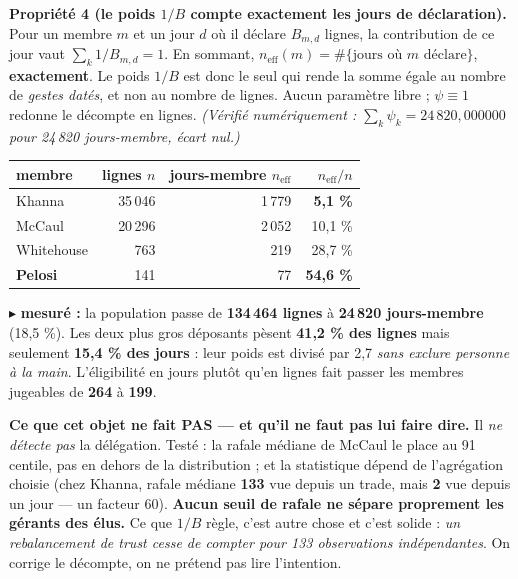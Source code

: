 \documentclass[11pt,a4paper]{article}
\newcommand{\prop}[2]{\vspace{0.6mm}\begin{mdframed}[linecolor=vert!60, backgroundcolor=vert!5, linewidth=0.6pt,
  roundcorner=3pt, innertopmargin=3pt, innerbottommargin=3pt]{\color{vert}\textbf{Propriété #1.}} #2\end{mdframed}\vspace{0.4mm}}
\newcommand{\mes}[1]{{\color{rouge}\small$\blacktriangleright$ \textbf{mesuré :} #1}\par}
\begin{document}
\prop{4 (le poids $1/B$ compte exactement les jours de déclaration)}{Pour un membre $m$ et un jour $d$ où il
déclare $B_{m,d}$ lignes, la contribution de ce jour vaut $\sum_{k} 1/B_{m,d} = 1$. En sommant,
$n_{\text{eff}}(m) = \#\{\text{jours où } m \text{ déclare}\}$, \textbf{exactement}. Le poids $1/B$ est donc le seul qui
rende la somme égale au nombre de \emph{gestes datés}, et non au nombre de lignes. Aucun paramètre libre ;
$\psi \equiv 1$ redonne le décompte en lignes.
\emph{(Vérifié numériquement : $\sum_k \psi_k = 24\,820{,}000000$ pour 24\,820 jours-membre, écart nul.)}}

\begin{center}\footnotesize
\begin{tabular}{@{}l r r r@{}}
\toprule
membre & lignes $n$ & \textbf{jours-membre} $n_{\text{eff}}$ & $n_{\text{eff}}/n$ \\
\midrule
Khanna & 35\,046 & 1\,779 & \textbf{5,1 \%} \\
McCaul & 20\,296 & 2\,052 & 10,1 \% \\
Whitehouse & \phantom{0,0}763 & \phantom{0,0}219 & 28,7 \% \\
\textbf{Pelosi} & \phantom{0,0}141 & \phantom{0,00}77 & \textbf{54,6 \%} \\
\bottomrule
\end{tabular}
\end{center}
\vspace{-1mm}
\mes{la population passe de \textbf{134\,464 lignes} à \textbf{24\,820 jours-membre} (18,5 \%). Les deux plus gros
déposants pèsent \textbf{41,2 \% des lignes} mais seulement \textbf{15,4 \% des jours} : leur poids est divisé par 2,7
\emph{sans exclure personne à la main}. L'éligibilité en jours plutôt qu'en lignes fait passer les membres jugeables
de \textbf{264} à \textbf{199}.}

\begin{mdframed}[linecolor=rouge!60, backgroundcolor=rouge!5, linewidth=0.6pt, roundcorner=3pt,
  innertopmargin=3pt, innerbottommargin=3pt]
{\small\textbf{Ce que cet objet ne fait PAS --- et qu'il ne faut pas lui faire dire.} Il \emph{ne détecte pas} la
délégation. Testé : la rafale médiane de McCaul le place au 91\ieme{} centile, pas en dehors de la distribution ;
et la statistique dépend de l'agrégation choisie (chez Khanna, rafale médiane \textbf{133} vue depuis un trade,
mais \textbf{2} vue depuis un jour --- un facteur 60). \textbf{Aucun seuil de rafale ne sépare proprement les gérants
des élus.} Ce que $1/B$ règle, c'est autre chose et c'est solide : \emph{un rebalancement de trust cesse de compter
pour 133 observations indépendantes}. On corrige le décompte, on ne prétend pas lire l'intention.}
\end{mdframed}
\end{document}
